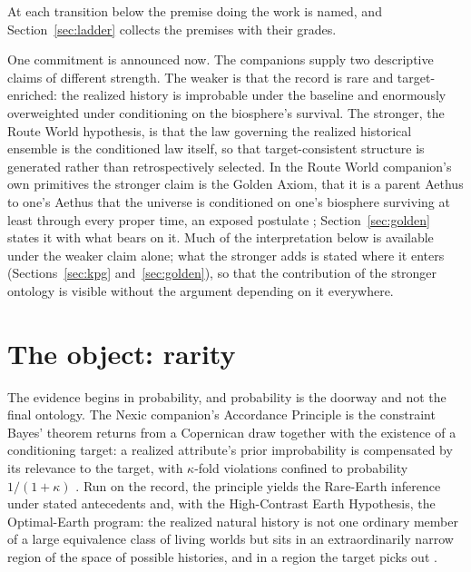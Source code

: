 At each transition below the premise doing the work is named, and
Section~\ref{sec:ladder} collects the premises with their grades.

One commitment is announced now. The companions supply two descriptive claims of different
strength. The weaker is that the record is rare and target-enriched: the
realized history is improbable under the baseline and enormously overweighted
under conditioning on the biosphere's survival. The stronger, the Route World
hypothesis, is that the law governing the realized historical ensemble is the
conditioned law itself, so that target-consistent structure is generated
rather than retrospectively selected. In the Route World companion's own
primitives the stronger claim is the Golden Axiom, that it is a parent
Aethus to one's Aethus that the universe is conditioned on one's biosphere
surviving at least through every proper time, an exposed postulate
\cite{GoldenRouteWorld}; Section~\ref{sec:golden} states it with what bears
on it. Much of the interpretation below is
available under the weaker claim alone; what the stronger adds is stated where
it enters (Sections~\ref{sec:kpg} and~\ref{sec:golden}), so that the
contribution of the stronger ontology is visible without the argument
depending on it everywhere.

\section{The object: rarity}\label{sec:rarity}

The evidence begins in probability, and probability is the doorway and not
the final ontology. The Nexic companion's Accordance Principle is the
constraint Bayes' theorem returns from a Copernican draw together with the
existence of a conditioning target: a realized attribute's prior improbability
is compensated by its relevance to the target, with $\kappa$-fold violations
confined to probability $1/(1+\kappa)$ \cite{Nexus,GoldenTargeted}. Run on the
record, the principle yields the Rare-Earth inference under stated antecedents
and, with the High-Contrast Earth Hypothesis, the Optimal-Earth program: the
realized natural history is not one ordinary member of a large equivalence
class of living worlds but sits in an extraordinarily narrow region of the
space of possible histories, and in a region the target picks out
\cite{AethusOptimalEarth}.

